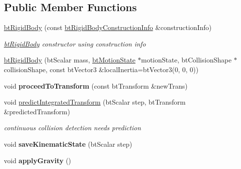 \subsection*{Public Member Functions}
\begin{DoxyCompactItemize}
\item 
\hypertarget{classbt_rigid_body_a66a55c268281f64e849851a929449ffd}{\hyperlink{classbt_rigid_body_a66a55c268281f64e849851a929449ffd}{bt\+Rigid\+Body} (const \hyperlink{structbt_rigid_body_1_1bt_rigid_body_construction_info}{bt\+Rigid\+Body\+Construction\+Info} \&construction\+Info)}\label{classbt_rigid_body_a66a55c268281f64e849851a929449ffd}

\begin{DoxyCompactList}\small\item\em \hyperlink{classbt_rigid_body}{bt\+Rigid\+Body} constructor using construction info \end{DoxyCompactList}\item 
\hyperlink{classbt_rigid_body_aac9b7d050bc87644d38e9ffe4fe4c5ab}{bt\+Rigid\+Body} (bt\+Scalar mass, \hyperlink{classbt_motion_state}{bt\+Motion\+State} $\ast$motion\+State, bt\+Collision\+Shape $\ast$collision\+Shape, const bt\+Vector3 \&local\+Inertia=bt\+Vector3(0, 0, 0))
\item 
\hypertarget{classbt_rigid_body_a70f38cd1bb359db4992a374da778bac7}{void {\bfseries proceed\+To\+Transform} (const bt\+Transform \&new\+Trans)}\label{classbt_rigid_body_a70f38cd1bb359db4992a374da778bac7}

\item 
\hypertarget{classbt_rigid_body_af7f9b40d0abcfe9927d2e9c011947cec}{void \hyperlink{classbt_rigid_body_af7f9b40d0abcfe9927d2e9c011947cec}{predict\+Integrated\+Transform} (bt\+Scalar step, bt\+Transform \&predicted\+Transform)}\label{classbt_rigid_body_af7f9b40d0abcfe9927d2e9c011947cec}

\begin{DoxyCompactList}\small\item\em continuous collision detection needs prediction \end{DoxyCompactList}\item 
\hypertarget{classbt_rigid_body_a77b69b89ec3dfcd502e122cfaafdf4f6}{void {\bfseries save\+Kinematic\+State} (bt\+Scalar step)}\label{classbt_rigid_body_a77b69b89ec3dfcd502e122cfaafdf4f6}

\item 
\hypertarget{classbt_rigid_body_a08f1a05a572e7ff53f3874bda43c75b9}{void {\bfseries apply\+Gravity} ()}\label{classbt_rigid_body_a08f1a05a572e7ff53f3874bda43c75b9}


\end{DoxyCompactItemize}
